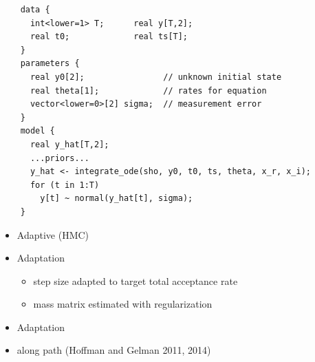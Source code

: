 \documentclass[10pt]{report}
\begin{document}

{\footnotesize
\begin{Verbatim}
    data {
      int<lower=1> T;      real y[T,2];
      real t0;             real ts[T];
    }
    parameters {
      real y0[2];                // unknown initial state
      real theta[1];             // rates for equation
      vector<lower=0>[2] sigma;  // measurement error
    }
    model {
      real y_hat[T,2];
      ...priors...
      y_hat <- integrate_ode(sho, y0, t0, ts, theta, x_r, x_i);
      for (t in 1:T)
        y[t] ~ normal(y_hat[t], sigma);
    }
\end{Verbatim}
}



\begin{itemize}
\item Adaptive  (HMC)
\item Adaptation 
  \vspace*{-4pt}
  \begin{itemize}\small
  \item step size adapted to target total acceptance rate
  \item mass matrix estimated with regularization
  \end{itemize}
\item Adaptation 
\item {} along path
\vfill
\hfill 
{\footnotesize (Hoffman and Gelman 2011, 2014)}
\end{itemize}


\end{document}
